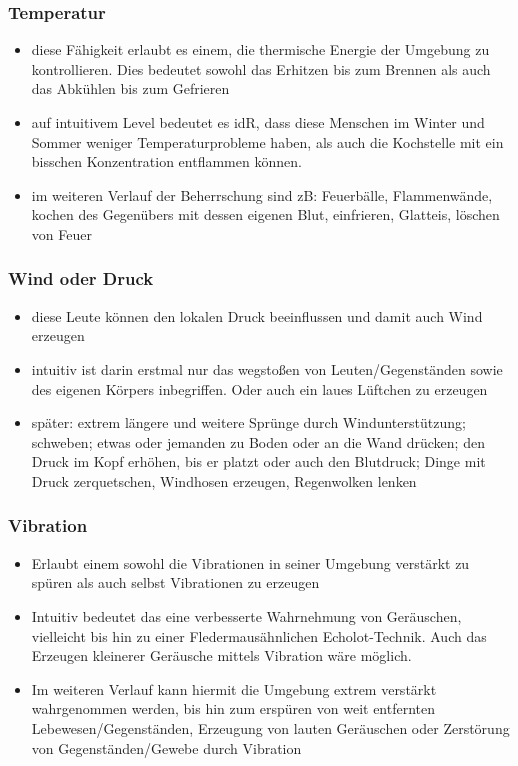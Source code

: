 \subsubsection{Temperatur}
\begin{itemize}
	\item diese Fähigkeit erlaubt es einem, die thermische Energie der Umgebung zu kontrollieren. Dies bedeutet sowohl das Erhitzen bis zum Brennen als auch das Abkühlen bis zum Gefrieren
	\item auf intuitivem Level bedeutet es idR, dass diese Menschen im Winter und Sommer weniger Temperaturprobleme haben, als auch die Kochstelle mit ein bisschen Konzentration entflammen können.
	\item im weiteren Verlauf der Beherrschung sind zB: Feuerbälle, Flammenwände, kochen des Gegenübers mit dessen eigenen Blut, einfrieren, Glatteis, löschen von Feuer
\end{itemize}

\subsubsection{Wind oder Druck}
\begin{itemize}
	\item diese Leute können den lokalen Druck beeinflussen und damit auch Wind erzeugen
	\item intuitiv ist darin erstmal nur das wegstoßen von Leuten/Gegenständen sowie des eigenen Körpers inbegriffen. Oder auch ein laues Lüftchen zu erzeugen
	\item später: extrem längere und weitere Sprünge durch Windunterstützung; schweben; etwas oder jemanden zu Boden oder an die Wand drücken; den Druck im Kopf erhöhen, bis er platzt oder auch den Blutdruck; Dinge mit Druck zerquetschen, Windhosen erzeugen, Regenwolken lenken
\end{itemize}

\subsubsection{Vibration}
\begin{itemize}
	\item Erlaubt einem sowohl die Vibrationen in seiner Umgebung verstärkt zu spüren als auch selbst Vibrationen zu erzeugen
	\item Intuitiv bedeutet das eine verbesserte Wahrnehmung von Geräuschen, vielleicht bis hin zu einer Fledermausähnlichen Echolot-Technik. Auch das Erzeugen kleinerer Geräusche mittels Vibration wäre möglich.
	\item Im weiteren Verlauf kann hiermit die Umgebung extrem verstärkt wahrgenommen werden, bis hin zum erspüren von weit entfernten Lebewesen/Gegenständen, Erzeugung von lauten Geräuschen oder Zerstörung von Gegenständen/Gewebe durch Vibration
\end{itemize}

